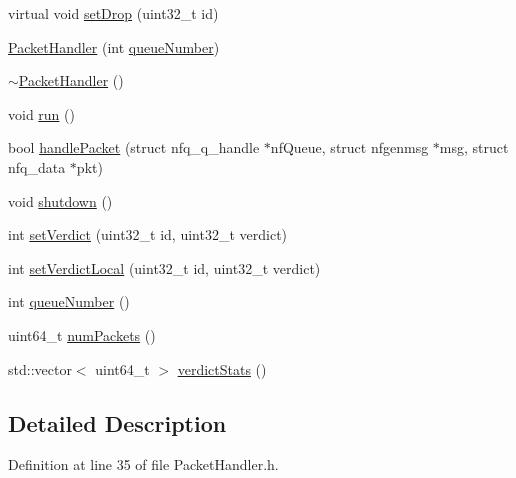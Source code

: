 \begin{DoxyCompactItemize}
virtual void \hyperlink{class_vsid_netfilter_1_1_packet_handler_ad0a799dbbe9a3e6e6310a4d303710aa1}{set\-Drop} (uint32\-\_\-t id)
\item 
\hyperlink{class_vsid_netfilter_1_1_packet_handler_a6a49b7914eaa9befb525446d5f447c7e}{Packet\-Handler} (int \hyperlink{class_vsid_netfilter_1_1_packet_handler_a0ae07d1e28782fae0302f9e09e3dbf58}{queue\-Number})
\item 
\hyperlink{class_vsid_netfilter_1_1_packet_handler_a0789067780b2d1d432a61fc675ec4db5}{$\sim$\-Packet\-Handler} ()
\item 
void \hyperlink{class_vsid_netfilter_1_1_packet_handler_a94f2a8768ddc7c1c492ce37304edb965}{run} ()
\item 
bool \hyperlink{class_vsid_netfilter_1_1_packet_handler_ada216d665b6f10fdd32442d3dd2634f3}{handle\-Packet} (struct nfq\-\_\-q\-\_\-handle $\ast$nf\-Queue, struct nfgenmsg $\ast$msg, struct nfq\-\_\-data $\ast$pkt)
\item 
void \hyperlink{class_vsid_netfilter_1_1_packet_handler_a2296b558ff874f5ddc27e9deecc7bd85}{shutdown} ()
\item 
int \hyperlink{class_vsid_netfilter_1_1_packet_handler_afc60de8576a1b1543b8e6b6f9fcca801}{set\-Verdict} (uint32\-\_\-t id, uint32\-\_\-t verdict)
\item 
int \hyperlink{class_vsid_netfilter_1_1_packet_handler_a7e8b3ee2c5447a74b41d8fe190c162d0}{set\-Verdict\-Local} (uint32\-\_\-t id, uint32\-\_\-t verdict)
\item 
int \hyperlink{class_vsid_netfilter_1_1_packet_handler_a0ae07d1e28782fae0302f9e09e3dbf58}{queue\-Number} ()
\item 
uint64\-\_\-t \hyperlink{class_vsid_netfilter_1_1_packet_handler_a1d9601d06fe28b986213d951645f90e9}{num\-Packets} ()
\item 
std\-::vector$<$ uint64\-\_\-t $>$ \hyperlink{class_vsid_netfilter_1_1_packet_handler_a7a9ae496da5a2eabeeeb2341eb107590}{verdict\-Stats} ()
\end{DoxyCompactItemize}


\subsection{Detailed Description}


Definition at line 35 of file Packet\-Handler.\-h.



